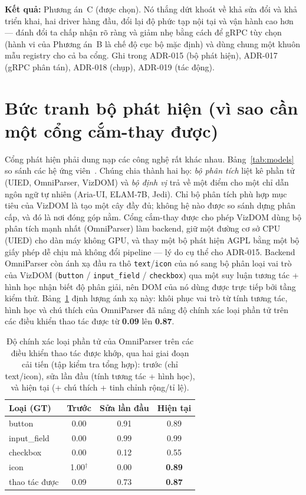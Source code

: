\documentclass[11pt,a4paper]{report}
\newcommand{\code}[1]{\texttt{#1}}
\begin{document}
\textbf{Kết quả:} Phương án~C (được chọn). Nó thắng dứt khoát về khả sửa đổi và khả
triển khai, hai driver hàng đầu, đổi lại độ phức tạp nội tại và vận hành cao hơn ---
đánh đổi ta chấp nhận rõ ràng và giảm nhẹ bằng cách để gRPC tùy chọn (hành vi của
Phương án~B là chế độ cục bộ mặc định) và dùng chung một khuôn mẫu registry cho cả ba
cổng. Ghi trong ADR-015 (bộ phát hiện), ADR-017 (gRPC phân tán), ADR-018 (chụp),
ADR-019 (tác động).

\section{Bức tranh bộ phát hiện (vì sao cần một cổng cắm-thay được)}
Cổng phát hiện phải dung nạp các công nghệ rất khác nhau. Bảng~\ref{tab:models} so
sánh các hệ ứng viên~\cite{xie2020uied,omniparser2024,ariaui2024,elam7b,osworldg}.
Chúng chia thành hai họ: \emph{bộ phân tích} liệt kê phần tử (UIED, OmniParser,
VizDOM) và \emph{bộ định vị} trả về một điểm cho một chỉ dẫn ngôn ngữ tự nhiên
(Aria-UI, ELAM-7B, Jedi). Chỉ bộ phân tích phù hợp mục tiêu của VizDOM là tạo một cây
đầy đủ; không hệ nào được so sánh dựng phân cấp, và đó là nơi đóng góp nằm. Cổng
cắm-thay được cho phép VizDOM dùng bộ phân tích mạnh nhất (OmniParser) làm backend,
giữ một đường cơ sở CPU (UIED) cho dàn máy không GPU, và thay một bộ phát hiện AGPL
bằng một bộ giấy phép dễ chịu mà không đổi pipeline --- lý do cụ thể cho ADR-015.
Backend OmniParser còn ánh xạ đầu ra thô \code{text}/\code{icon} của nó sang bộ phân
loại vai trò của VizDOM (\code{button} / \code{input\_field} / \code{checkbox}) qua
một suy luận tương tác + hình học nhận biết độ phân giải, nên DOM của nó dùng được
trực tiếp bởi tầng kiểm thử. Bảng~\ref{tab:arc42typeacc} định lượng ánh xạ này: khôi
phục vai trò từ tính tương tác, hình học và chú thích của OmniParser đã nâng độ chính
xác loại phần tử trên các điều khiển thao tác được từ \textbf{0.09} lên \textbf{0.87}.

\begin{table}[H]
  \centering\footnotesize
  \caption{Độ chính xác loại phần tử của OmniParser trên các điều khiển thao tác được
  khớp, qua hai giai đoạn cải tiến (tập kiểm tra tổng hợp): trước (chỉ text/icon), sửa
  lần đầu (tính tương tác + hình học), và hiện tại (+ chú thích + tinh chỉnh rộng/tỉ lệ).}
  \label{tab:arc42typeacc}
  \begin{tabular}{@{}lccc@{}}
    \toprule
    Loại (GT) & Trước & Sửa lần đầu & Hiện tại \\
    \midrule
    button       & 0.00 & 0.91 & 0.89 \\
    input\_field & 0.00 & 0.99 & 0.99 \\
    checkbox     & 0.00 & 0.12 & 0.55 \\
    icon         & 1.00$^\dagger$ & 0.00 & \textbf{0.89} \\
    \midrule
    thao tác được & 0.09 & 0.73 & \textbf{0.87} \\
    \bottomrule
  \end{tabular}
\end{table}
\end{document}
